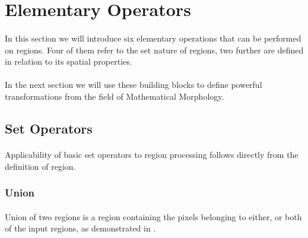 
\section{Elementary Operators}

\paragraph*{}
In this section we will introduce six elementary operations that can be performed on regions. Four of them refer to the set nature of regions, two further are defined in relation to its spatial properties. 

\paragraph*{}
In the next section we will use these building blocks to define powerful transformations from the field of Mathematical Morphology.

\subsection{Set Operators}

\paragraph*{}
Applicability of basic set operators to region processing follows directly from the definition of region. 

\subsubsection{Union}

\paragraph*{}
Union of two regions is a region containing the pixels belonging to either, or both of the input regions, as demonstrated in .

\newarray\unionInputA
{}

\newarray\unionInputB
{}

